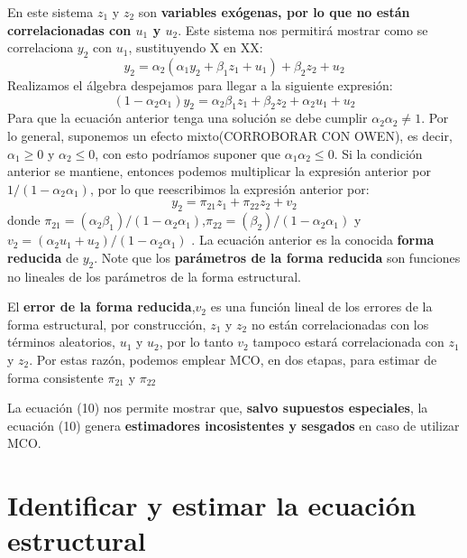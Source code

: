 \documentclass[a4paper,11pt]{book}
\begin{document}
En este sistema $z_{1}$ y $z_{2}$ son \textbf{variables exógenas, por lo que no están correlacionadas con $u_{1}$ y $u_{2}$}. Este sistema nos permitirá mostrar como se correlaciona $y_{2}$ con $u_{1}$, sustituyendo X en XX:
\begin{equation}
y_{2} = \alpha_{2}(\alpha_{1}y_{2} + \beta_{1}z_{1} + u_{1}) + \beta_{2}z_{2} + u_{2}
\end{equation}
Realizamos el álgebra despejamos para llegar a la siguiente expresión:
\begin{equation}
(1-\alpha_{2}\alpha_{1})y_{2} = \alpha_{2}\beta_{1}z_{1} + \beta_{2}z_{2} + \alpha_{2}u_{1} + u_{2}
\end{equation}
Para que la ecuación anterior tenga una solución se debe cumplir $\alpha_{2}\alpha_{2} \not= 1 $. Por lo general, suponemos un efecto mixto(CORROBORAR CON OWEN), es decir, $\alpha_{1} \geq 0$ y  $\alpha_{2} \leq 0$, con esto podríamos suponer que $\alpha_{1}\alpha_{2} \leq 0$. 
Si la condición anterior se mantiene, entonces podemos multiplicar la expresión anterior por $1/(1-\alpha_{2}\alpha_{1})$, por lo que reescribimos la expresión anterior por:
\begin{equation}
y_{2} = \pi_{21}z_{1} + \pi_{22}z_{2} + v_{2}
\end{equation}
donde $\pi_{21} = (\alpha_{2}\beta_{1})/(1-\alpha_{2}\alpha_{1})$,$\pi_{22} = (\beta_{2})/(1-\alpha_{2}\alpha_{1})$ y $v_{2} = (\alpha_{2}u_{1} + u_{2})/(1-\alpha_{2}\alpha_{1})$ . La ecuación anterior es la conocida \textbf{forma reducida} de $y_{2}$. Note que los \textbf{parámetros de la forma reducida} son funciones no lineales de los parámetros de la forma estructural.

El \textbf{error de la forma reducida},$v_{2}$ es una función lineal de los errores de la forma estructural, por construcción, $z_{1}$ y $z_{2}$ no están correlacionadas con los términos aleatorios, $u_{1}$ y $u_{2}$, por lo tanto $v_{2}$ tampoco estará correlacionada con  $z_{1}$ y $z_{2}$. Por estas razón, podemos emplear MCO, en dos etapas, para estimar de forma consistente $\pi_{21}$ y $\pi_{22}$

La ecuación (10) nos permite mostrar que, \textbf{salvo supuestos especiales}, la ecuación (10) genera \textbf{estimadores incosistentes y sesgados} en caso de utilizar MCO.  

\section{Identificar y estimar la ecuación estructural}
\end{document}
